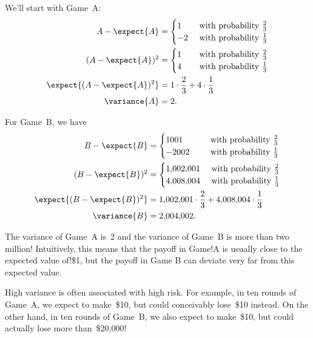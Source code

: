 We'll start with Game~A:
\begin{align}
A - \expect{A}
        & = \begin{cases}
                 1 & \text{ with probability $\frac{2}{3}$} \\
                -2 & \text{ with probability $\frac{1}{3}$}
            \end{cases}
    \notag\\
(A - \expect{A})^2
        & = \begin{cases}
                1\phantom{-} & \text{ with probability $\frac{2}{3}$} \\
                4 & \text{ with probability $\frac{1}{3}$}
            \end{cases}
    \notag\\
\expect{(A - \expect{A})^2}
        & =     1 \cdot \frac{2}{3} + 4 \cdot \frac{1}{3} \notag\\
\variance{A} & =  2. \label{eqn:18A7}
\end{align}

For Game~B, we have
\begin{align*}
B - \expect{B}
        & = \begin{cases}
                1001\phantom{,001} & \text{ with probability $\frac{2}{3}$} \\
               -2002 & \text{ with probability $\frac{1}{3}$}
            \end{cases} \\
(B - \expect{B})^2
        & = \begin{cases}
                1{,}002{,}001 & \text{ with probability $\frac{2}{3}$} \\
                4{,}008{,}004 & \text{ with probability $\frac{1}{3}$}
            \end{cases} \\
\expect{(B - \expect{B})^2}
        & =     1{,}002{,}001 \cdot \frac{2}{3} + 4{,}008{,}004 \cdot \frac{1}{3} \\
\variance{B} & =   2{,}004{,}002.
\end{align*}

The variance of Game~A is~2 and the variance of Game~B is more than
two million!  Intuitively, this means that the payoff in Game!A is
usually close to the expected value of!\$1, but the payoff in Game B
can deviate very far from this expected value.

High variance is often associated with high risk.  For example, in ten
rounds of Game~A, we expect to make~\$10, but could conceivably
lose~\$10 instead.  On the other hand, in ten rounds of Game~B, we
also expect to make~\$10, but could actually lose more than~\$20,000!

